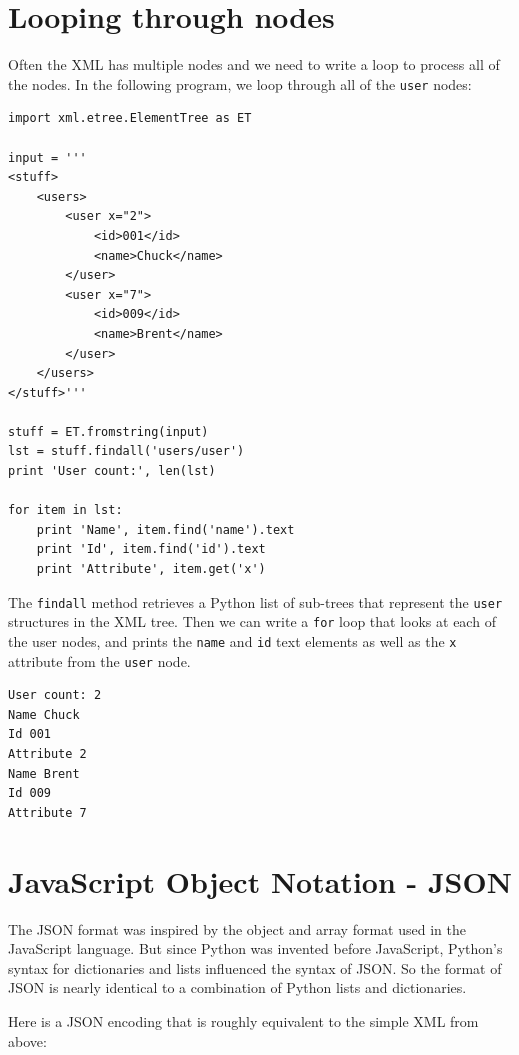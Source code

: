 \documentclass[11pt]{book}
\begin{document}
\section{Looping through nodes}

Often the XML has multiple nodes and we need to write a loop
to process all of the nodes.  In the following program, 
we loop through all of the {\tt user} nodes:

\beforeverb
\begin{verbatim}
import xml.etree.ElementTree as ET

input = '''
<stuff>
    <users>
        <user x="2">
            <id>001</id>
            <name>Chuck</name>
        </user>
        <user x="7">
            <id>009</id>
            <name>Brent</name>
        </user>
    </users>
</stuff>'''

stuff = ET.fromstring(input)
lst = stuff.findall('users/user')
print 'User count:', len(lst)

for item in lst:
    print 'Name', item.find('name').text
    print 'Id', item.find('id').text
    print 'Attribute', item.get('x')
\end{verbatim}
\afterverb
%
The {\tt findall} method retrieves a Python list of sub-trees that
represent the {\tt user} structures in the XML tree.  Then we can 
write a {\tt for} loop that looks at each of the user nodes, and 
prints the {\tt name} and {\tt id} text elements as well as the 
{\tt x} attribute from the {\tt user} node.

\beforeverb
\begin{verbatim}
User count: 2
Name Chuck
Id 001
Attribute 2
Name Brent
Id 009
Attribute 7
\end{verbatim}
\afterverb
%

\section{JavaScript Object Notation - JSON}

The JSON format was inspired by the object and array format used in the JavaScript
language.  But since Python was invented before JavaScript, Python's syntax
for dictionaries and lists influenced the syntax of JSON.  So the format of JSON
is nearly identical to a combination of Python lists and dictionaries.

Here is a JSON encoding that is roughly equivalent to the simple XML from above:
\end{document}
